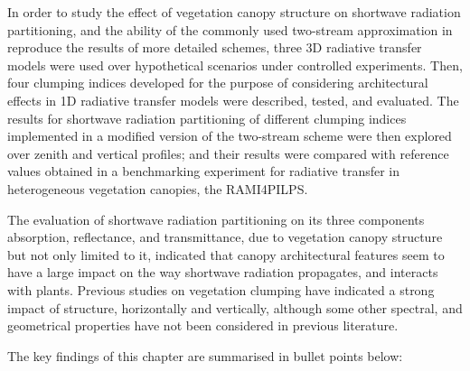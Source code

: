 \documentclass[a4paper,11pt]{report}
\begin{document}
In order to study the effect of vegetation canopy structure on shortwave radiation partitioning, and the ability of the commonly used two-stream approximation in reproduce the results of more detailed schemes, three 3D radiative transfer models were used over hypothetical scenarios under controlled experiments. Then, four clumping indices developed for the purpose of considering architectural effects in 1D radiative transfer models were described, tested, and evaluated. The results for shortwave radiation partitioning of different clumping indices implemented in a modified version of the two-stream scheme were then explored over zenith and vertical profiles; and their results were compared with reference values obtained in a benchmarking experiment for radiative transfer in heterogeneous vegetation canopies, the RAMI4PILPS.

The evaluation of shortwave radiation partitioning on its three components absorption, reflectance, and transmittance, due to vegetation canopy structure but not only limited to it, indicated that canopy architectural features seem to have a large impact on the way shortwave radiation propagates, and interacts with plants. Previous studies on vegetation clumping \citep{Chen2008} have indicated a strong impact of structure, horizontally and vertically, although some other spectral, and geometrical properties have not been considered in previous literature. 

The key findings of this chapter are summarised in bullet points below:
\end{document}
